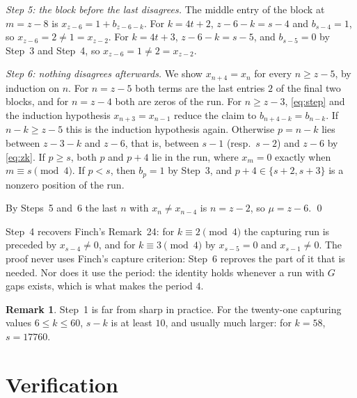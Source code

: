 \documentclass[11pt]{amsart}
\theoremstyle{definition}
\newtheorem{remark}[thm]{Remark}
\begin{document}
\emph{Step 5: the block before the last disagrees.} The middle entry of the block at $m=z-8$ is
$x_{z-6}=1+b_{z-6-k}$. For $k=4t+2$, $z-6-k=s-4$ and $b_{s-4}=1$, so $x_{z-6}=2\neq1=x_{z-2}$. For $k=4t+3$,
$z-6-k=s-5$, and $b_{s-5}=0$ by Step~3 and Step~4, so $x_{z-6}=1\neq2=x_{z-2}$.

\emph{Step 6: nothing disagrees afterwards.} We show $x_{n+4}=x_n$ for every $n\ge z-5$, by induction on $n$.
For $n=z-5$ both terms are the last entries $2$ of the final two blocks, and for $n=z-4$ both are zeros of the
run. For $n\ge z-3$, \eqref{eq:step} and the induction hypothesis $x_{n+3}=x_{n-1}$ reduce the claim to
$b_{n+4-k}=b_{n-k}$. If $n-k\ge z-5$ this is the induction hypothesis again. Otherwise $p=n-k$ lies between
$z-3-k$ and $z-6$, that is, between $s-1$ (resp.\ $s-2$) and $z-6$ by \eqref{eq:zk}. If $p\ge s$, both $p$ and
$p+4$ lie in the run, where $x_m=0$ exactly when $m\equiv s\pmod 4$. If $p<s$, then $b_p=1$ by Step~3, and
$p+4\in\{s+2,s+3\}$ is a nonzero position of the run.

By Steps~5 and~6 the last $n$ with $x_n\neq x_{n-4}$ is $n=z-2$, so $\mu=z-6$. \qed

Step~4 recovers Finch's Remark~24: for $k\equiv2\pmod4$ the capturing run is preceded by $x_{s-4}\neq0$, and for
$k\equiv3\pmod 4$ by $x_{s-5}=0$ and $x_{s-1}\neq0$. The proof never uses Finch's capture criterion: Step~6
reproves the part of it that is needed. Nor does it use the period: the identity holds whenever a run with $G$
gaps exists, which is what makes the period $4$.

\begin{remark}
Step~1 is far from sharp in practice. For the twenty-one capturing values $6\le k\le60$, $s-k$ is at least
$10$, and usually much larger: for $k=58$, $s=17760$.
\end{remark}

\section{Verification}
\end{document}
